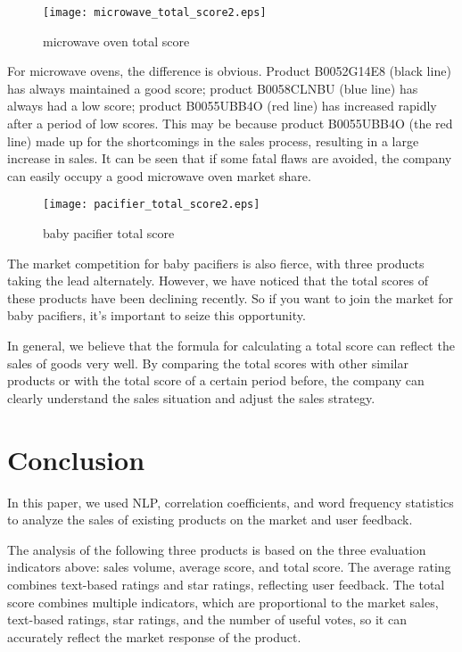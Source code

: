 \documentclass{mcmthesis}
\begin{document}
	\begin{figure}[H]
		\small
		\centering
		\texttt{[image: microwave\_total\_score2.eps]}
		\caption{microwave oven total score} \label{fig:microwave total score}
	\end{figure}
	
	For microwave ovens, the difference is obvious. Product B0052G14E8 (black line) has always maintained a good score; product B0058CLNBU (blue line) has always had a low score; product B0055UBB4O (red line) has increased rapidly after a period of low scores. This may be because product B0055UBB4O (the red line) made up for the shortcomings in the sales process, resulting in a large increase in sales. It can be seen that if some fatal flaws are avoided, the company can easily occupy a good microwave oven market share.
	
	\begin{figure}[H]
		\small
		\centering
		\texttt{[image: pacifier\_total\_score2.eps]}
		\caption{baby pacifier total score} \label{fig:pacifier total score}
	\end{figure}
	
	The market competition for baby pacifiers is also fierce, with three products taking the lead alternately. However, we have noticed that the total scores of these products have been declining recently. So if you want to join the market for baby pacifiers, it's important to seize this opportunity.
	
	In general, we believe that the formula for calculating a total score can reflect the sales of goods very well. By comparing the total scores with other similar products or with the total score of a certain period before, the company can clearly understand the sales situation and adjust the sales strategy.
	
	
	\section{Conclusion}
	
	In this paper, we used NLP, correlation coefficients, and word frequency statistics to analyze the sales of existing products on the market and user feedback.
	
	The analysis of the following three products is based on the three evaluation indicators above: sales volume, average score, and total score. The average rating combines text-based ratings and star ratings, reflecting user feedback. The total score combines multiple indicators, which are proportional to the market sales, text-based ratings, star ratings, and the number of useful votes, so it can accurately reflect the market response of the product.
	
\end{document}
